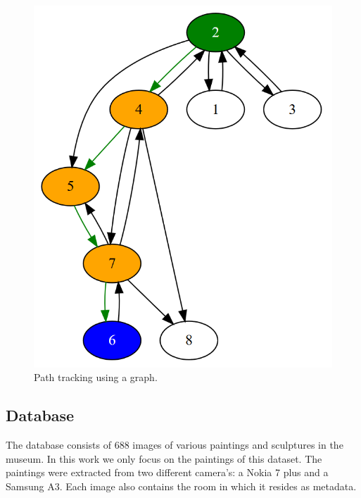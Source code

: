 \documentclass[10pt,final,journal]{IEEEtran}
\begin{document}
	

	\begin{figure}
		\includegraphics[width=\linewidth]{groundplan_msk_simple_graph}
		\caption{Path tracking using a graph. }
		\label{fig:groundplan_msk_simple_graph}
	\end{figure}
	
	\subsection{Database}
	The database consists of 688 images of various paintings and sculptures in the museum. In this work we only focus on the paintings of this dataset. The paintings were extracted from two different camera's: a Nokia 7 plus and a Samsung A3. Each image also contains the room in which it resides as metadata.  
	
\end{document}
